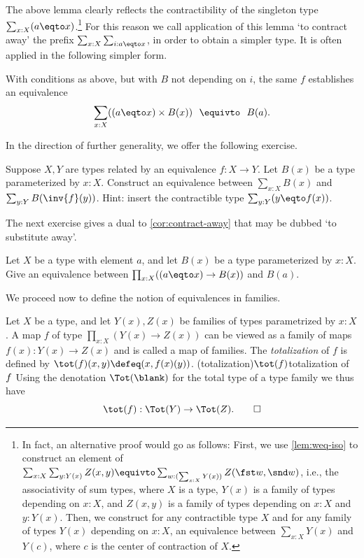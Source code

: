 The above lemma clearly reflects the contractibility of the
singleton type $\sum_{x:X}(a \eqto x)$.\footnote{%
  In fact, an alternative proof would go as follows:
  \label{ft:Sigma-assoc}
  First, we use \cref{lem:weq-iso} to construct an element of
  $\sum_{x:X}\sum_{y:Y(x)}Z(x,y)
  \equivto \sum_{w : (\sum_{x:X}Y(x))}Z(\fst w,\snd w)$, i.e.,
  the associativity of sum types, where $X$ is a type,
  $Y(x)$ is a family of types depending on $x:X$,
  and $Z(x,y)$ is a family of types depending on $x:X$ and $y:Y(x)$.
  Then, we construct for any contractible type $X$
  and for any family of types $Y(x)$ depending on $x:X$,
  an equivalence between $\sum_{x:X}Y(x)$ and $Y(c)$,
  where $c$ is the center of contraction of $X$.}
For this reason
we call application of this lemma `to contract away'
the prefix $\sum_{x:X} \sum_{i: a \eqto x}$, in order
to obtain a simpler type. It is often applied
in the following simpler form.

\begin{corollary}\label{cor:contract-away}
With conditions as above, but with $B$ not depending on $i$, the same $f$
establishes an equivalence
\[
 \sum_{x:X} ((a \eqto x)\times B(x))~~\equivto~~B(a).
\]
\end{corollary}

In the direction of further generality, we offer the following exercise.

\begin{xca}\label{xca:sum-equiv-base}
  Suppose $X,Y$ are types related by an equivalence $f : X \to Y$.
  Let $B(x)$ be a type parameterized by $x:X$. Construct an 
  equivalence between $\sum_{x:X}B(x)$ and $\sum_{y:Y}B(\inv{f}(y))$.
  Hint: insert the contractible type $\sum_{y:Y}(y\eqto f(x))$.
\end{xca}

The next exercise gives a dual to \cref{cor:contract-away}
that may be dubbed `to substitute away'.

\begin{xca}\label{xca:substitute-away}
Let $X$ be a type with element $a$, and let
$B(x)$ be a type parameterized by $x:X$.
Give an equivalence between $\prod_{x:X} ((a \eqto x)\to B(x))$ and $B(a)$.
\end{xca}

We proceed now to define the notion of equivalences in families.

\begin{definition}\label{def:fiberwise}
Let $X$ be a type, and let $Y(x),Z(x)$ be families of types parametrized
by $x:X$. A map $f$ of type $\prod_{x:X}(Y(x)\to Z(x))$
can be viewed as a family of maps $f(x): Y(x)\to Z(x)$ and is called a
map of families. The \emph{totalization} of $f$ is defined by
$\tot(f)(x,y)\defeq (x,f(x)(y))$.
\glossary(totalization){$\protect\tot(f)$}{totalization of $\protect f$}
Using the denotation $\Tot(\blank)$ for the total type of
a type family we thus have
\[
  \tot(f) : \Tot(Y) \to \Tot(Z).\qedhere
\]
\end{definition}

